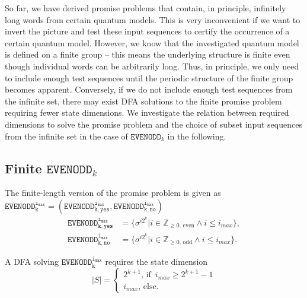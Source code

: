 \documentclass[../main.tex]{subfiles}
\begin{document}
So far, we have derived promise problems that contain, in principle, infinitely long words from certain quantum models. This is very inconvenient if we want to invert the picture and test these input sequences to certify the occurrence of a certain quantum model. However, we know that the investigated quantum model is defined on a finite group -- this means the underlying structure is finite even though individual words can be arbitrarily long. Thus, in principle, we only need to include enough test sequences until the periodic structure of the finite group becomes apparent. Conversely, if we do not include enough test sequences from the infinite set, there may exist DFA solutions to the finite promise problem requiring fewer state dimensions.
We investigate the relation between required dimensions to solve the promise problem and the choice of subset input sequences from the infinite set in the case of $\mathtt{EVENODD}_k$ in the following.

\subsection{Finite $\mathtt{EVENODD}_k$}

\begin{definition}\label{def:finiteevenodd}
    The finite-length version of the promise problem is given as $\mathtt{EVENODD_k^{i_{max}}} = (\mathtt{EVENODD^{i_{max}}_{k,yes}}, \mathtt{EVENODD^{i_{max}}_{k,no}})$ 
    \begin{align}
        \mathtt{EVENODD^{i_{max}}_{k,yes}} &= \{ \sigma^{i2^k} | i \in \mathbb{Z}_{\geq 0,\,\mathrm{even}} \land i \leq i_{max}\},
        \\
        \mathtt{EVENODD^{i_{max}}_{k,no}} &= \{ \sigma^{i2^k} | i \in \mathbb{Z}_{\geq 0,\,\mathrm{odd} } \land i \leq i_{max} \}.
    \end{align}
\end{definition}

\begin{theorem}\label{theorem:finitepp}
    A DFA solving $\mathtt{EVENODD_k^{i_{max}}}$ requires the state dimension 
    \begin{equation}
        |S| = 
        \begin{cases}
            2^{k+1},\, \text{if} \enspace i_{max} \geq 2^{k+1} - 1 \\
            i_{max},\, \text{else}. 
        \end{cases}
    \end{equation}
\end{theorem}
\end{document}
